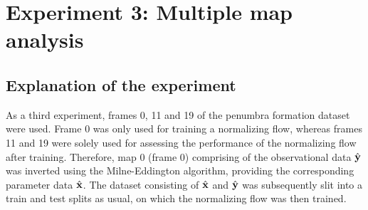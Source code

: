 \documentclass[a4paper,12pt]{report}
\begin{document}
\FloatBarrier

\section{Experiment 3: Multiple map analysis}
\subsection{Explanation of the experiment}\label{sec:explanation_experiment_3}
As a third experiment, frames 0, 11 and 19 of the penumbra formation dataset were used. Frame 0 was only used for training a normalizing flow, whereas frames 11 and 19 were solely used for assessing the performance of the normalizing flow after training. Therefore, map 0 (frame 0) comprising of the observational data $\hat{\boldsymbol{\mathbf{y}}}$ was inverted using the Milne-Eddington algorithm, providing the corresponding parameter data $\hat{\boldsymbol{\mathbf{x}}}$. The dataset consisting of $\hat{\boldsymbol{\mathbf{x}}}$ and $\hat{\boldsymbol{\mathbf{y}}}$ was subsequently slit into a train and test splits as usual, on which the normalizing flow was then trained.
\end{document}
